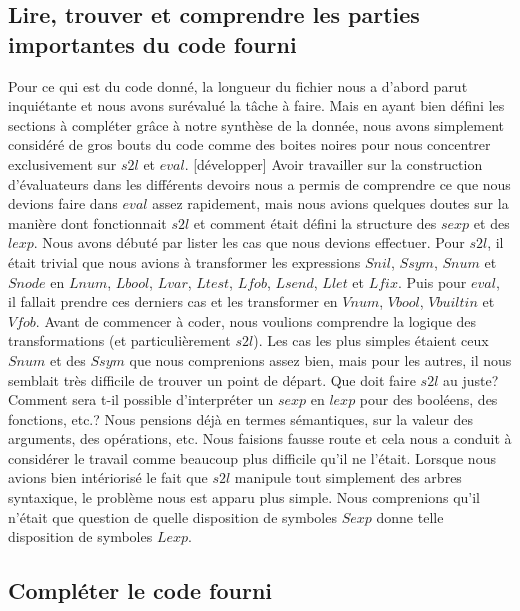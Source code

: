 \documentclass{article}
\begin{document}
	\subsection{Lire, trouver et comprendre les parties importantes du code fourni}

	Pour ce qui est du code donné, la longueur du fichier nous a d'abord parut
	inquiétante et nous avons surévalué la tâche à faire. Mais en ayant bien défini
	les sections à compléter grâce à notre synthèse de la donnée, nous avons
	simplement considéré de gros bouts du code comme des boites noires pour nous
	concentrer exclusivement sur $s2l$ et $eval$. [développer] Avoir travailler sur
	la construction d'évaluateurs dans les différents devoirs nous a permis de comprendre
	ce que nous devions faire dans $eval$ assez rapidement, mais nous avions
	quelques doutes sur la manière dont fonctionnait $s2l$ et comment était défini
	la structure des $sexp$ et des $lexp$. Nous avons débuté par lister les cas que
	nous devions effectuer. Pour $s2l$, il était trivial que nous avions à transformer
	les expressions $Snil$, $Ss ym$, $Snum$ et $Snode$ en $Lnum$, $Lbool$, $Lvar$,
	$Ltest$, $Lfob$, $Lsend$, $Llet$ et $Lfix$. Puis pour $eval$, il fallait prendre
	ces derniers cas et les transformer en $Vnum$, $Vbool$, $Vbuiltin$ et $Vfob$.
	Avant de commencer à coder, nous voulions comprendre la logique des transformations
	(et particulièrement $s2l$). Les cas les plus simples étaient ceux $Snum$ et
	des $Ssym$ que nous comprenions assez bien, mais pour les autres, il nous
	semblait très difficile de trouver un point de départ. Que doit faire $s2l$ au
	juste? Comment sera t-il possible d'interpréter un $sexp$ en $lexp$ pour des
	booléens, des fonctions, etc.? Nous pensions déjà en termes sémantiques, sur la
	valeur des arguments, des opérations, etc. Nous faisions fausse route et cela
	nous a conduit à considérer le travail comme beaucoup plus difficile qu'il ne
	l'était. Lorsque nous avions bien intériorisé le fait que $s2l$ manipule tout simplement
	des arbres syntaxique, le problème nous est apparu plus simple. Nous comprenions
	qu'il n'était que question de quelle disposition de symboles $Sexp$ donne telle
	disposition de symboles $Lexp$.

	\subsection{Compléter le code fourni}
\end{document}
